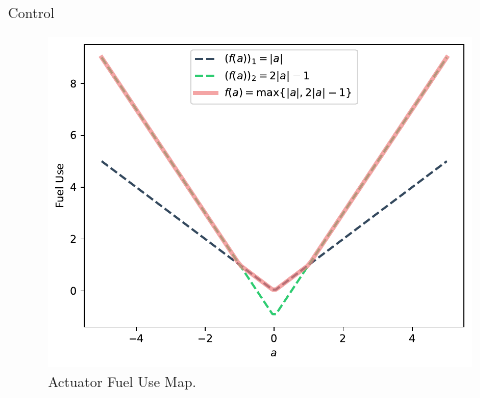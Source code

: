\begin{chapter}{Control}
    \begin{figure}[h]
        \centering
        \includegraphics[width=\linewidth]{examples/cvx-ch4/actuator_fuel-use.pdf}
        \caption{Actuator Fuel Use Map.}
        \label{fig:fuel-map}
    \end{figure}


\end{chapter}
